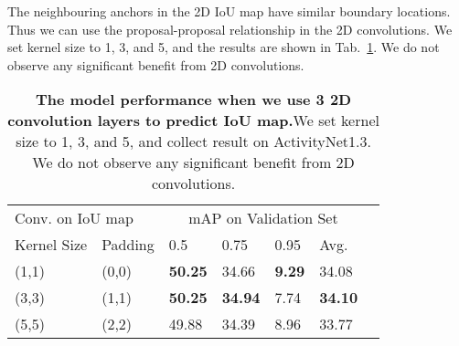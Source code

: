 \documentclass[10pt,twocolumn,letterpaper]{article}
\begin{document}
The neighbouring anchors in the 2D IoU map have similar boundary locations. Thus we can use the proposal-proposal relationship in the 2D convolutions. We set kernel size to 1, 3, and 5, and the results are shown in Tab.~\ref{tab:abl_Conv_on_IOU_map}. We do not observe any significant benefit from 2D convolutions.

\begin{table}[h]
\centering
\caption{\textbf{The model performance when we use 3 2D convolution layers to predict IoU map.}We set kernel size to 1, 3, and 5, and collect result on ActivityNet1.3. We do not observe any significant benefit from 2D convolutions.}
\small
\begin{tabular}{p{1.5cm}<{\centering}p{0.7cm}<{\centering}|p{0.65cm}<{\centering}p{0.65cm}<{\centering}p{0.65cm}<{\centering}p{0.55cm}<{\centering}p{0.65cm}<{\centering}}
\hline
\multicolumn{2}{p{3.2cm}|}{ Conv. on IoU map} & \multicolumn{4}{c}{mAP on Validation Set}\\
Kernel Size & Padding  &  0.5  &  0.75  & 0.95  & Avg. \\
\hline
(1,1) & (0,0)   & {\textbf{50.25}} & {34.66} & \textbf{9.29} & {34.08} \\
(3,3) & (1,1)   & {\textbf{50.25}} & {\textbf{34.94}} & 7.74 & {\textbf{34.10}} \\
(5,5) & (2,2)   & {49.88} & {34.39} & 8.96 & {33.77} \\
\hline
\end{tabular}
\label{tab:abl_Conv_on_IOU_map}
\end{table}
\end{document}
